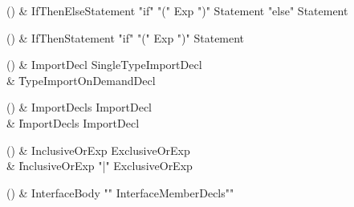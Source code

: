 \begin{bbgrammarappendix}

() & IfThenElseStatement \label{prod:IfThenElseStatement}  \: \xcd"if" \xcd"(" Exp \xcd")" Statement  \xcd"else" Statement   \\


\end{bbgrammarappendix}

\begin{bbgrammarappendix}

() & IfThenStatement \label{prod:IfThenStatement}  \: \xcd"if" \xcd"(" Exp \xcd")" Statement  \\


\end{bbgrammarappendix}

\begin{bbgrammarappendix}

() & ImportDecl \label{prod:ImportDecl}  \: SingleTypeImportDecl  \\

 &    \| TypeImportOnDemandDecl \\

\end{bbgrammarappendix}

\begin{bbgrammarappendix}

() & ImportDecls \label{prod:ImportDecls}  \: ImportDecl  \\

 &    \| ImportDecls ImportDecl \\

\end{bbgrammarappendix}

\begin{bbgrammarappendix}

() & InclusiveOrExp \label{prod:InclusiveOrExp}  \: ExclusiveOrExp  \\

 &    \| InclusiveOrExp \xcd"|" ExclusiveOrExp \\

\end{bbgrammarappendix}

\begin{bbgrammarappendix}

() & InterfaceBody \label{prod:InterfaceBody}  \: \xcd"{" InterfaceMemberDecls\opt \xcd"}"  \\


\end{bbgrammarappendix}

